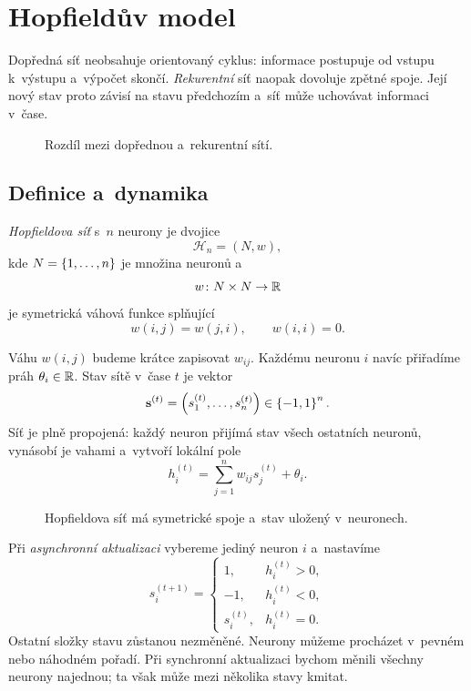 \clearpage
\section{Hopfieldův model}\label{sec:ai-hopfield}

Dopředná síť neobsahuje orientovaný cyklus: informace postupuje od vstupu k~výstupu a~výpočet skončí. \emph{Rekurentní} síť naopak dovoluje zpětné spoje. Její nový stav proto závisí na stavu předchozím a~síť může uchovávat informaci v~čase.

\begin{figure}[ht]
    \centering
    
    \caption{Rozdíl mezi dopřednou a~rekurentní sítí.}
    \label{fig:ai-dopredna-rekurentni}
\end{figure}

\subsection{Definice a~dynamika}

\begin{definition}\label{def:ai-hopfield}
    \emph{Hopfieldova síť} s~\(n\) neurony je dvojice
    \[
        \mathcal H_n=(N,w),
    \]
    kde \(N=\left\{1,\ldots,n\right\}\) je množina neuronů a
    \[
        w\colon N\times N\to\mathbb{R}
    \]
    je symetrická váhová funkce splňující
    \[
        w(i,j)=w(j,i),
        \qquad
        w(i,i)=0.
    \]
\end{definition}

Váhu \(w(i,j)\) budeme krátce zapisovat \(w_{ij}\). Každému neuronu \(i\) navíc přiřadíme práh \(\theta_i\in\mathbb{R}\). Stav sítě v~čase \(t\) je vektor
\[
    \mathbf{s}^{(t)}
    =
    \left(
        s_1^{(t)},\ldots,s_n^{(t)}
    \right)
    \in\left\{-1,1\right\}^{n}.
\]
Síť je plně propojená: každý neuron přijímá stav všech ostatních neuronů, vynásobí je vahami a~vytvoří lokální pole
\[
    h_i^{(t)}
    =
    \sum_{j=1}^{n}w_{ij}s_j^{(t)}+\theta_i.
\]

\begin{figure}[ht]
    \centering
    
    \caption{Hopfieldova síť má symetrické spoje a~stav uložený v~neuronech.}
    \label{fig:ai-hopfield-sit}
\end{figure}

Při \emph{asynchronní aktualizaci} vybereme jediný neuron \(i\) a~nastavíme
\[
    s_i^{(t+1)}
    =
    \begin{cases}
        1, & h_i^{(t)}>0,\\
        -1, & h_i^{(t)}<0,\\
        s_i^{(t)}, & h_i^{(t)}=0.
    \end{cases}
\]
Ostatní složky stavu zůstanou nezměněné. Neurony můžeme procházet v~pevném nebo náhodném pořadí. Při synchronní aktualizaci bychom měnili všechny neurony najednou; ta však může mezi několika stavy kmitat.

